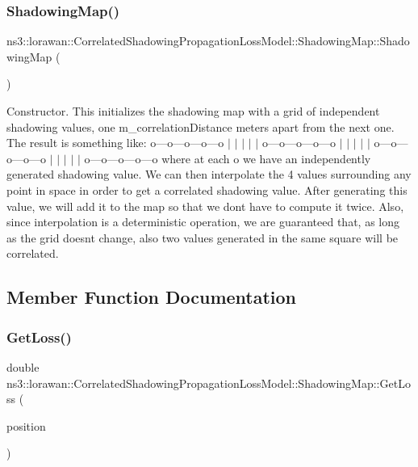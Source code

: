 \subsubsection{\texorpdfstring{Shadowing\+Map()}{ShadowingMap()}}
{\footnotesize\ttfamily ns3\+::lorawan\+::\+Correlated\+Shadowing\+Propagation\+Loss\+Model\+::\+Shadowing\+Map\+::\+Shadowing\+Map (\begin{DoxyParamCaption}{ }\end{DoxyParamCaption})}

Constructor. This initializes the shadowing map with a grid of independent shadowing values, one m\+\_\+correlation\+Distance meters apart from the next one. The result is something like\+: o---o---o---o---o $\vert$ $\vert$ $\vert$ $\vert$ $\vert$ o---o---o---o---o $\vert$ $\vert$ $\vert$ $\vert$ $\vert$ o---o---o---o---o $\vert$ $\vert$ $\vert$ $\vert$ $\vert$ o---o---o---o---o where at each o we have an independently generated shadowing value. We can then interpolate the 4 values surrounding any point in space in order to get a correlated shadowing value. After generating this value, we will add it to the map so that we don\textquotesingle{}t have to compute it twice. Also, since interpolation is a deterministic operation, we are guaranteed that, as long as the grid doesn\textquotesingle{}t change, also two values generated in the same square will be correlated. 

\subsection{Member Function Documentation}
\mbox{\label{classns3_1_1lorawan_1_1CorrelatedShadowingPropagationLossModel_1_1ShadowingMap_a683e51a85e85fc9638a915e5de90679d}} 
\subsubsection{\texorpdfstring{Get\+Loss()}{GetLoss()}}
{\footnotesize\ttfamily double ns3\+::lorawan\+::\+Correlated\+Shadowing\+Propagation\+Loss\+Model\+::\+Shadowing\+Map\+::\+Get\+Loss (\begin{DoxyParamCaption}\item[{\hyperlink{classns3_1_1lorawan_1_1CorrelatedShadowingPropagationLossModel_1_1Position}{Correlated\+Shadowing\+Propagation\+Loss\+Model\+::\+Position}}]{position }\end{DoxyParamCaption})}

